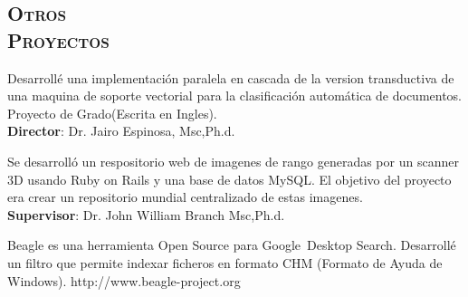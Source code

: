 \begin{resume}
\section{\textsc{Otros\\  Proyectos}}

\begin{position}
Desarroll\'{e} una implementaci\'{o}n  paralela en cascada de la version transductiva de una maquina de soporte vectorial
para la clasificaci\'{o}n autom\'{a}tica de documentos. Proyecto de Grado(Escrita en Ingles).\\
\textbf{Director}:  Dr. Jairo Espinosa, Msc,Ph.d.
\end{position}

\begin{position}
 Se desarroll\'{o} un respositorio web de imagenes de rango generadas por un scanner 3D  usando Ruby on Rails y una base de datos MySQL.
El objetivo del proyecto era crear un repositorio mundial centralizado de estas imagenes. \\
 \textbf{Supervisor}: Dr. John William Branch Msc,Ph.d.
\end{position}

\begin{position}
Beagle es una herramienta Open Source para Google\texttrademark  \  Desktop Search. Desarroll\'{e} un filtro que permite
indexar ficheros en formato CHM (Formato de Ayuda de Windows).
http://www.beagle-project.org
\end{position}



\end{resume}
